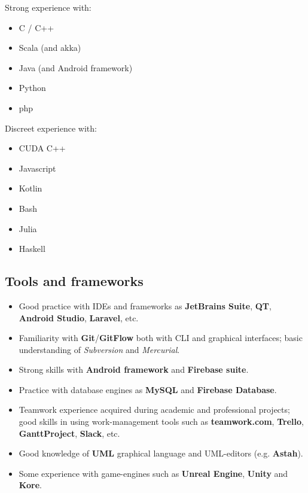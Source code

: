 \documentclass[letterpaper]{twentysecondcv} %
\begin{document}
\begin{minipage}[t]{0.45\linewidth}
	Strong experience with:
	\small
	\begin{itemize}[noitemsep]
		\item C / C++
		\item Scala (and akka)
		\item Java (and Android framework)
		\item Python
		\item php
	\end{itemize}
\end{minipage}
\begin{minipage}[t]{0.45\linewidth}
	Discreet experience with:
	\begin{itemize}[noitemsep,nolistsep]
		\item CUDA C++
		\item Javascript
		\item Kotlin
		\item Bash
		\item Julia
		\item Haskell
	\end{itemize}
\end{minipage}


\subsection{Tools and frameworks}
\begin{itemize}[noitemsep,nolistsep]
	\item Good practice with IDEs and frameworks as \textbf{JetBrains Suite}, \textbf{QT}, \textbf{Android Studio}, \textbf{Laravel}, etc.
	\item Familiarity with \textbf{Git}/\textbf{GitFlow} both with CLI and graphical interfaces; basic understanding of \textit{Subversion} and \textit{Mercurial}.
	\item Strong skills with \textbf{Android framework} and \textbf{Firebase suite}.
	\item Practice with database engines as \textbf{MySQL} and \textbf{Firebase Database}.
	\item Teamwork experience acquired during academic and professional projects; good skills in using work-management tools such as \textbf{teamwork.com}, \textbf{Trello}, \textbf{GanttProject}, \textbf{Slack}, etc.
	\item Good knowledge of \textbf{UML} graphical language and UML-editors (e.g. \textbf{Astah}).
	\item Some experience with game-engines such as \textbf{Unreal Engine}, \textbf{Unity} and \textbf{Kore}.
\end{itemize}
\end{document}
